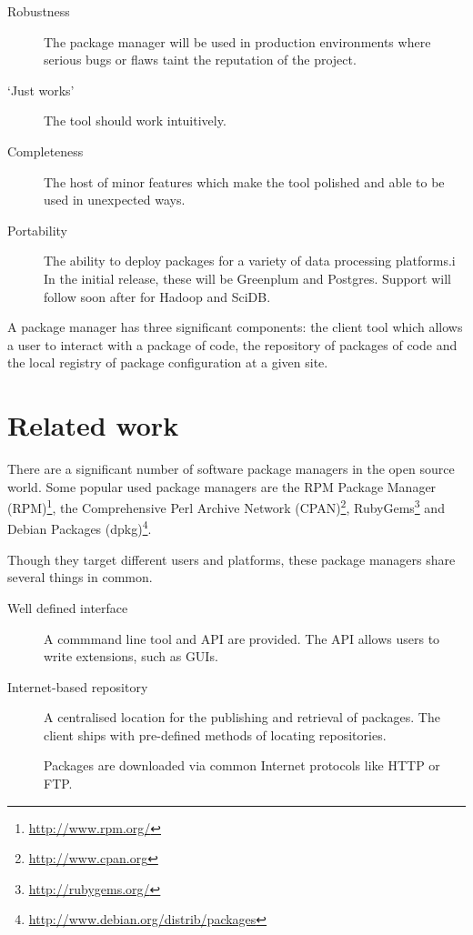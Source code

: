 \documentclass[11pt]{article}
\begin{document}
{\begin{description}
		\item[Robustness] The package manager will be used in production
		environments where serious bugs or flaws taint the reputation of the
		project.

		\item[`Just works'] The tool should work intuitively.

		\item[Completeness] The host of minor features which make the tool
		polished and able to be used in unexpected ways.

		\item[Portability] The ability to deploy packages for a variety of
		data processing platforms.i In the initial release, these will be
		Greenplum and Postgres. Support will follow soon after for Hadoop and
		SciDB.

	\end{description}

	A package manager has three significant components: the client tool which
	allows a user to interact with a package of code, the repository of packages
	of code and the local registry of package configuration at a given site.

\section{Related work}

There are a significant number of software package managers in the open source
world. Some popular used package managers are the
RPM Package Manager (RPM)\footnote{\url{http://www.rpm.org/}}, 
the Comprehensive Perl Archive Network
(CPAN)\footnote{\url{http://www.cpan.org}},
RubyGems\footnote{\url{http://rubygems.org/}} and
Debian Packages (dpkg)\footnote{\url{http://www.debian.org/distrib/packages}}.

Though they target different users and platforms, these package managers share
several things in common.

\begin{description}
	\item[Well defined interface] A commmand line tool and API are provided.
	The API allows users to write extensions, such as GUIs.

	\item[Internet-based repository] A centralised location for the publishing
	and retrieval of packages. The client ships with pre-defined methods of
	locating repositories.

	Packages are downloaded via common Internet protocols like HTTP or FTP.


\end{description}}
\end{document}

